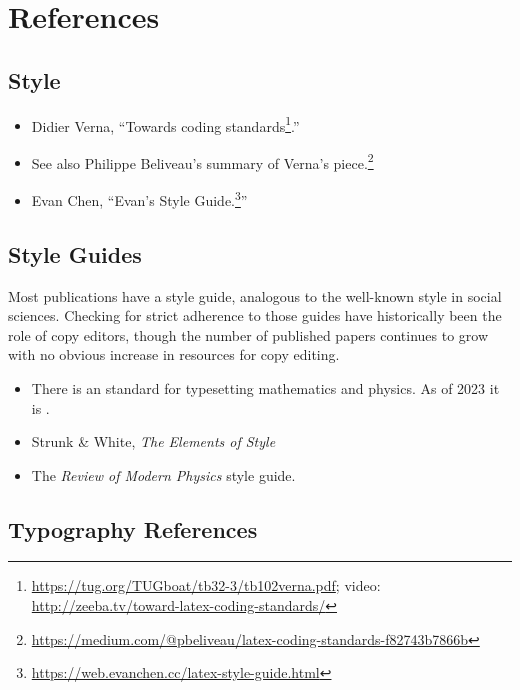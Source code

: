 
\section{References}

\subsection{\texorpdfstring{\LaTeXx Style}{LaTeX Style}}

\begin{itemize}
    \item Didier Verna, ``Towards \LaTeXx coding standards\footnote{\url{https://tug.org/TUGboat/tb32-3/tb102verna.pdf}; video: \url{http://zeeba.tv/toward-latex-coding-standards/}}.'' 
    \item See also Philippe Beliveau's summary of Verna's piece.\footnote{\url{https://medium.com/@pbeliveau/latex-coding-standards-f82743b7866b}}
    \item Evan Chen, ``Evan's \LaTeXx Style Guide.\footnote{\url{https://web.evanchen.cc/latex-style-guide.html}}''
\end{itemize}


\subsection{Style Guides}

Most publications have a style guide, analogous to the well-known  style in social sciences. Checking for strict adherence to those guides have historically been the role of copy editors, though the number of published papers continues to grow with no obvious increase in resources for copy editing. 

\begin{itemize}
    \item There is an  standard for typesetting mathematics and physics. As of 2023 it is .
    \item Strunk \& White, \emph{The Elements of Style}
    \item The \emph{Review of Modern Physics} style guide. 
\end{itemize}

\subsection{Typography References}


